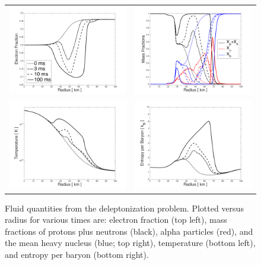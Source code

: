\documentclass[11pt,letterpaper,twoside,english,final]{article}
\begin{document}
\begin{figure}[h]
  \centering
  \begin{tabular}{cc}
    \includegraphics[width=.475\textwidth]{./Figures/DeleptonizationProblem1D_ElectronFraction.png} &
    \includegraphics[width=.475\textwidth]{./Figures/DeleptonizationProblem1D_MassFractions.png} \\
    \includegraphics[width=.475\textwidth]{./Figures/DeleptonizationProblem1D_Temperature.png} &
    \includegraphics[width=.475\textwidth]{./Figures/DeleptonizationProblem1D_EntropyPerBaryon.png}
  \end{tabular}
  \vspace{-0.1in}
  \flushleft\caption[Fluid quantities from the deleptonization problem.]{Fluid quantities from the deleptonization problem.  \textmd{Plotted versus radius for various times are: electron fraction (top left), mass fractions of protons plus neutrons (black), alpha particles (red), and the mean heavy nucleus (blue; top right), temperature (bottom left), and entropy per baryon (bottom right).}}
  \label{fig:deleptonizationProblemFluid}
\end{figure}
\end{document}

